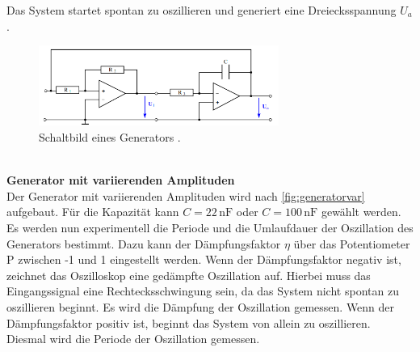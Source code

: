 Das System startet spontan zu oszillieren und generiert eine Dreiecksspannung $U_a$.\\
\begin{figure}
    \centering
    \includegraphics[width=0.7\textwidth]{generator.png}
    \caption{Schaltbild eines Generators \cite{ap51}.}
    \label{fig:generator}
\end{figure}
\\
\textbf{Generator mit variierenden Amplituden}\\
Der Generator mit variierenden Amplituden wird nach \autoref{fig:generatorvar} aufgebaut. Für die Kapazität kann $C=22\,\text{nF}$ oder 
$C=100\,\text{nF}$ gewählt werden. Es werden nun experimentell die Periode und die Umlaufdauer 
der Oszillation des Generators bestimmt. Dazu kann der Dämpfungsfaktor $\eta$ über das Potentiometer P zwischen -1 und 1 
eingestellt werden. Wenn der Dämpfungsfaktor negativ ist, zeichnet das Oszilloskop eine gedämpfte Oszillation auf. Hierbei muss das Eingangssignal 
eine Rechtecksschwingung sein, da das System nicht spontan zu oszillieren beginnt. Es wird die Dämpfung der Oszillation gemessen.
Wenn der Dämpfungsfaktor positiv ist, beginnt das System von allein zu oszillieren. Diesmal wird die Periode der Oszillation gemessen. 

